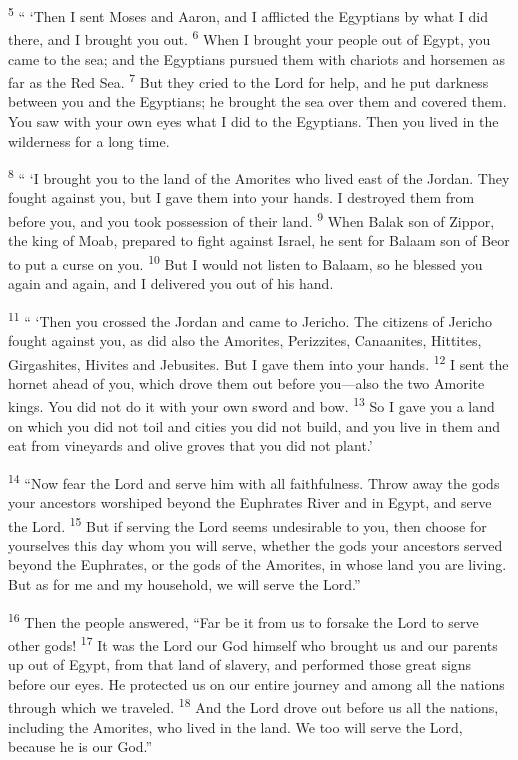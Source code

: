 \documentclass[12pt,twoside]{article}
\newcommand{\vs}[1]{\textsuperscript{#1}}
\begin{document}
\vs{5} `` `Then I sent Moses and Aaron, and I afflicted the Egyptians by what I did there, and I brought you out.
\vs{6} When I brought your people out of Egypt, you came to the sea; and the Egyptians pursued them with chariots and horsemen as far as the Red Sea.
\vs{7} But they cried to the Lord for help, and he put darkness between you and the Egyptians; he brought the sea over them and covered them. You saw with your own eyes what I did to the Egyptians. Then you lived in the wilderness for a long time.

\vs{8} `` `I brought you to the land of the Amorites who lived east of the Jordan. They fought against you, but I gave them into your hands. I destroyed them from before you, and you took possession of their land.
\vs{9} When Balak son of Zippor, the king of Moab, prepared to fight against Israel, he sent for Balaam son of Beor to put a curse on you.
\vs{10} But I would not listen to Balaam, so he blessed you again and again, and I delivered you out of his hand.

\vs{11} `` `Then you crossed the Jordan and came to Jericho. The citizens of Jericho fought against you, as did also the Amorites, Perizzites, Canaanites, Hittites, Girgashites, Hivites and Jebusites. But I gave them into your hands.
\vs{12} I sent the hornet ahead of you, which drove them out before you---also the two Amorite kings. You did not do it with your own sword and bow.
\vs{13} So I gave you a land on which you did not toil and cities you did not build, and you live in them and eat from vineyards and olive groves that you did not plant.'

\vs{14} ``Now fear the Lord and serve him with all faithfulness. Throw away the gods your ancestors worshiped beyond the Euphrates River and in Egypt, and serve the Lord.
\vs{15} But if serving the Lord seems undesirable to you, then choose for yourselves this day whom you will serve, whether the gods your ancestors served beyond the Euphrates, or the gods of the Amorites, in whose land you are living. But as for me and my household, we will serve the Lord.''

\vs{16} Then the people answered, ``Far be it from us to forsake the Lord to serve other gods!
\vs{17} It was the Lord our God himself who brought us and our parents up out of Egypt, from that land of slavery, and performed those great signs before our eyes. He protected us on our entire journey and among all the nations through which we traveled.
\vs{18} And the Lord drove out before us all the nations, including the Amorites, who lived in the land. We too will serve the Lord, because he is our God.''
\end{document}
